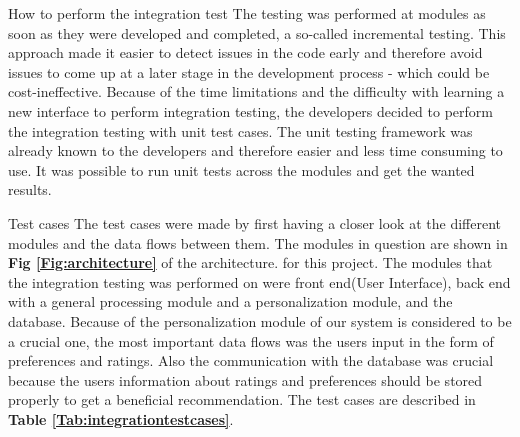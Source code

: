 How to perform the integration test\newline
The testing was performed at modules as soon as they were developed and completed, a so-called incremental testing. This approach made it easier to detect issues in the code early and therefore avoid issues to come up at a later stage in the development process - which could be cost-ineffective.
Because of the time limitations and the difficulty with learning a new interface to perform integration testing, the developers decided to perform the integration testing with unit test cases. The unit testing framework was already known to the developers and therefore easier and less time consuming to use. It was possible to run unit tests across the modules and get the wanted results.\newline

Test cases\newline 
The test cases were made by first having a closer look at the different modules and the data flows between them. The modules in question are shown in \textbf{Fig \ref{Fig:architecture}} of the architecture. for this project. The modules that the integration testing was performed on were front end(User Interface), back end with a general processing module and a personalization module, and the database. Because of the personalization module of our system is considered to be a crucial one, the most important data flows was the users input in the form of preferences and ratings. Also the communication with the database was crucial because the users information about ratings and preferences should be stored properly to get a beneficial recommendation. The test cases are described in \textbf{Table \ref{Tab:integrationtestcases}}.

